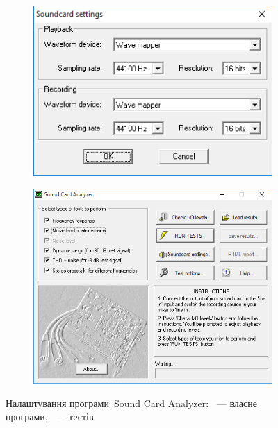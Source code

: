 \documentclass[
	a4paper,
	oneside,
	BCOR = 10mm,
	DIV = 12,
	12pt,
	headings = normal,
]{scrartcl}
\begin{document}
			\begin{figure}[!htbp]
				\centering
				\begin{subfigure}[t]{\columnwidth / 2}
					\centering
					\includegraphics[height=8\baselineskip]{./assets/y03s02-pcdiag-lab-07-p00-01-sca-prerun.png}
					\caption{}
					\label{subfig:sca-prerun-01}
				\end{subfigure}%
				\begin{subfigure}[t]{\columnwidth / 2}
					\centering
					\includegraphics[height=10\baselineskip]{./assets/y03s02-pcdiag-lab-07-p00-02-sca-prerun.png}
					\caption{}
					\label{subfig:sca-prerun-02}
				\end{subfigure}
				\caption{Налаштування програми~\textenglish{Sound Card Analyzer}: ~— власне програми, ~— тестів}
				\label{fig:sca}
			\end{figure}
\end{document}

